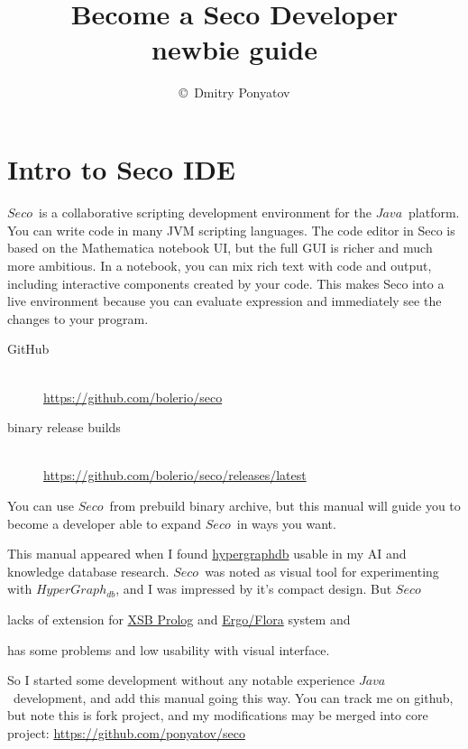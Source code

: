 \documentclass[oneside,10pt]{book}
\author{\copyright\ Dmitry Ponyatov \email{dponyatov@gmail.com}}
\title{\ \\\ \\Become a Seco Developer\\newbie guide}
\newcounter{secdepth}\setcounter{secdepth}{0}
\newcommand{\secdown}{\addtocounter{secdepth}{-1}}
\newcommand{\secly}[1]{
\section*{#1}
\addcontentsline{toc}{section}{#1}
}
\newcommand{\seco}{$Seco$}
\newcommand{\hgdb}{$HyperGraph_{db}$}
\newcommand{\java}{$Java$}
\begin{document}
\maketitle
\tableofcontents\secdown
\clearpage

\secly{Intro to Seco IDE}

\seco\ is a collaborative scripting development environment for the \java\
platform. You can write code in many JVM scripting languages. The code editor in
Seco is based on the Mathematica notebook UI, but the full GUI is richer and
much more ambitious. In a notebook, you can mix rich text with code and output,
including interactive components created by your code. This makes Seco into a
live environment because you can evaluate expression and immediately see the
changes to your program.

\begin{description}
\item[GitHub]\ \\
\url{https://github.com/bolerio/seco}
\item[binary release builds]\ \\
\url{https://github.com/bolerio/seco/releases/latest}
\end{description}

You can use \seco\ from prebuild binary archive, but this manual will guide you
to become a developer able to expand \seco\ in ways you want.

\bigskip
This manual appeared when I found
\href{http://www.hypergraphdb.org/}{hypergraphdb} usable in my AI and knowledge
database research. \seco\ was noted as visual tool for experimenting with \hgdb,
and I was impressed by it's compact design. But \seco

\begin{description}[nosep]
\item[\href{https://github.com/bolerio/seco/issues/46}{issue 46}]
lacks of extension for \href{http://xsb.sourceforge.net/}{XSB Prolog} and
\href{http://coherentknowledge.com/comparison-of-ergo-suite-to-flora-2/}{Ergo/Flora}
system and
\item[\href{https://github.com/bolerio/seco/issues/45}{issue 45}]
has some problems and low usability with visual interface.
\end{description}

\bigskip
So I started some development without any notable experience \java\ development,
and add this manual going this way. You can track me on github, but note this is
fork project, and my modifications may be merged into core project:
\url{https://github.com/ponyatov/seco}
\end{document}
